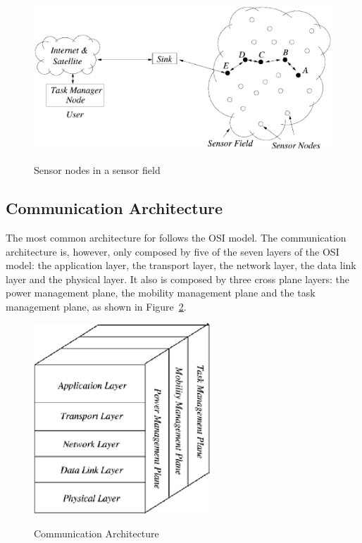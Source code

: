 \begin{figure}[H]
      \caption{Sensor nodes in a sensor field \cite{Akyildiz2002}}
      \centering
      \includegraphics[scale=0.5]{Chapters/Figures/sensor_nodes_in_sensor_fields.png}
      \label{fig:sensor_nodes_in_sensor_fields}
\end{figure}

\subsection{Communication Architecture}
\label{subsec:wsn_communication_architecture}
The most common architecture for  follows the OSI model. The 
communication architecture is, however, only composed by five of the seven layers of the OSI
model: the application layer, the transport layer, the network layer, the data link layer
and the physical layer. It also is composed by three cross plane layers: the power management
plane, the mobility management plane and the task management plane, as shown in
Figure~\ref{fig:wsn_architecture}.

\begin{figure}[H]
      \caption{ Communication Architecture \cite{Akyildiz2002}}
      \centering
      \includegraphics[scale=0.5]{Chapters/Figures/wsn_architecture.png}
      \label{fig:wsn_architecture}
\end{figure}

